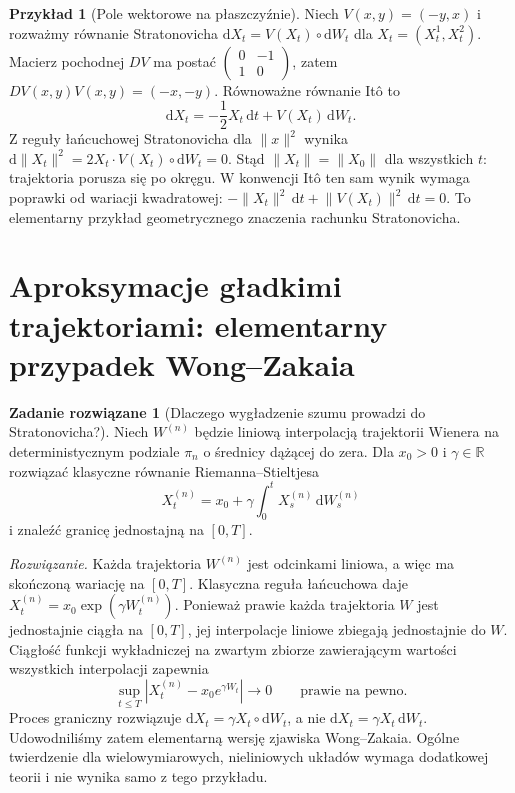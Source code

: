 \documentclass[11pt,a4paper,oneside]{report}
\numberwithin{equation}{chapter}
\theoremstyle{plain}
\theoremstyle{definition}
\newtheorem{przyklad}{Przykład}[chapter]
\newtheorem{zadanie}{Zadanie rozwiązane}[chapter]
\theoremstyle{remark}
\newcommand{\R}{\mathbb{R}}
\newcommand{\dd}{\mathrm{d}}
\newcommand{\norm}[1]{\lVert #1\rVert}
\begin{document}
\begin{przyklad}[Pole wektorowe na płaszczyźnie]
Niech $V(x,y)=(-y,x)$ i rozważmy równanie
Stratonovicha $\dd X_t=V(X_t)\circ\dd W_t$
dla $X_t=(X_t^1,X_t^2)$. Macierz pochodnej $DV$
ma postać $\left(\begin{smallmatrix}0&-1\\1&0\end{smallmatrix}\right)$,
zatem $DV(x,y)V(x,y)=(-x,-y)$.
Równoważne równanie Itô to
\[
\dd X_t=-\frac12X_t\,\dd t+V(X_t)\,\dd W_t.
\]
Z reguły łańcuchowej Stratonovicha dla $\norm{x}^2$
wynika $\dd\norm{X_t}^2=2X_t\cdot V(X_t)\circ\dd W_t=0$.
Stąd $\norm{X_t}=\norm{X_0}$ dla wszystkich $t$:
trajektoria porusza się po okręgu. W konwencji Itô
ten sam wynik wymaga poprawki od wariacji kwadratowej:
$-\norm{X_t}^2\,\dd t+\norm{V(X_t)}^2\,\dd t=0$.
To elementarny przykład geometrycznego znaczenia
rachunku Stratonovicha.
\end{przyklad}

\section{Aproksymacje gładkimi trajektoriami: elementarny przypadek Wong--Zakaia}\label{sec:volIII:04:06}
\begin{zadanie}[Dlaczego wygładzenie szumu prowadzi do Stratonovicha?]
Niech $W^{(n)}$ będzie liniową interpolacją
trajektorii Wienera na deterministycznym podziale
$\pi_n$ o średnicy dążącej do zera. Dla $x_0>0$
i $\gamma\in\R$ rozwiązać klasyczne równanie
Riemanna--Stieltjesa
\[
X_t^{(n)}=x_0+\gamma\int_0^t
X_s^{(n)}\,\dd W_s^{(n)}
\]
i znaleźć granicę jednostajną na $[0,T]$.

\emph{Rozwiązanie.} Każda trajektoria $W^{(n)}$
jest odcinkami liniowa, a więc ma skończoną wariację
na $[0,T]$. Klasyczna reguła łańcuchowa daje
$X_t^{(n)}=x_0\exp(\gamma W_t^{(n)})$.
Ponieważ prawie każda trajektoria $W$ jest
jednostajnie ciągła na $[0,T]$, jej interpolacje
liniowe zbiegają jednostajnie do $W$. Ciągłość
funkcji wykładniczej na zwartym zbiorze zawierającym
wartości wszystkich interpolacji zapewnia
\[
\sup_{t\le T}|X_t^{(n)}-x_0e^{\gamma W_t}|
\longrightarrow0\qquad\text{prawie na pewno}.
\]
Proces graniczny rozwiązuje
$\dd X_t=\gamma X_t\circ\dd W_t$,
a nie $\dd X_t=\gamma X_t\,\dd W_t$.
Udowodniliśmy zatem elementarną wersję zjawiska
Wong--Zakaia. Ogólne twierdzenie dla wielowymiarowych,
nieliniowych układów wymaga dodatkowej teorii i
nie wynika samo z tego przykładu.
\end{zadanie}
\end{document}
